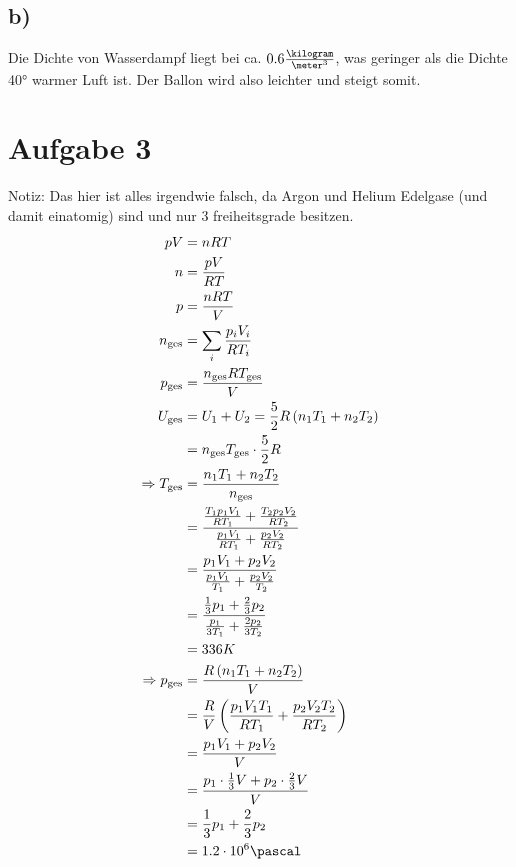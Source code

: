 \documentclass[12pt,a4paper,notitlepage]{article}
\newcommand{\aufgabe}[1]{\section*{\setcounter{section}{#1}Aufgabe #1}}
\begin{document}
\subsection*{b)}
Die Dichte von Wasserdampf liegt bei ca. $0.6\frac{\kilogram}{\meter^3}$, was geringer als die Dichte 40° warmer Luft ist. Der Ballon wird also leichter und steigt somit.
\aufgabe{3}
Notiz: Das hier ist alles irgendwie falsch, da Argon und Helium Edelgase (und damit einatomig) sind und nur 3 freiheitsgrade besitzen.
\begin{align}
pV&=nRT\\
n&=\frac{pV}{RT}\\
p&=\frac{nRT}{V}\\
n_\text{ges}&=\sum_i\frac{p_iV_i}{RT_i}\\
p_\text{ges}&=\frac{n_\text{ges}RT_\text{ges}}{V}\\
U_\text{ges}&=U_1+U_2=\frac{5}{2}R\left(n_1T_1+n_2T_2\right)\\
&=n_\text{ges}T_\text{ges}\cdot\frac{5}{2}R\\
\Rightarrow T_\text{ges}&=\frac{n_1T_1+n_2T_2}{n_\text{ges}}\\
&=\frac{\frac{T_1p_1V_1}{RT_1}+\frac{T_2p_2V_2}{RT_2}}{\frac{p_1V_1}{RT_1}+\frac{p_2V_2}{RT_2}}\\
&=\frac{p_1V_1+p_2V_2}{\frac{p_1V_1}{T_1}+\frac{p_2V_2}{T_2}}\\
&=\frac{\frac{1}{3}p_1+\frac{2}{3}p_2}{\frac{p_1}{3T_1}+\frac{2p_2}{3T_2}}\\
&=336K\\
\Rightarrow p_\text{ges}&=\frac{R\left(n_1T_1+n_2T_2\right)}{V}\\
&=\frac{R}{V}\left(\frac{p_1V_1T_1}{RT_1}+\frac{p_2V_2T_2}{RT_2}\right)\\
&=\frac{p_1V_1+p_2V_2}{V}\\
&=\frac{p_1\cdot\frac{1}{3}V+p_2\cdot\frac{2}{3}V}{V}\\
&=\frac{1}{3}p_1+\frac{2}{3}p_2\\
&=1.2\cdot 10^6\pascal
\end{align}
\end{document}
